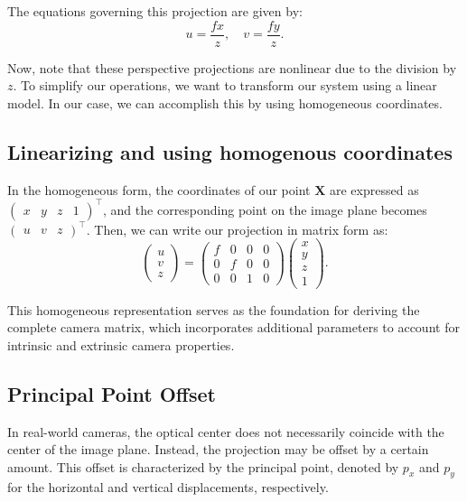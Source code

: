\documentclass[12pt]{article}
\begin{document}
The equations governing this projection are given by:
$$
u = \frac{f x}{z}, \quad v = \frac{f y}{z}.
$$

Now, note that these perspective projections are nonlinear due to the division by $z$. To simplify our operations, we want to transform our system using a linear model. In our case, we can accomplish this by using homogeneous coordinates.

\subsection{Linearizing and using homogenous coordinates}

In the homogeneous form, the coordinates of our point $\mathbf{X}$ are expressed as $\begin{pmatrix} x & y & z & 1 \end{pmatrix}^\top$, and the corresponding point on the image plane becomes $\begin{pmatrix} u & v & z \end{pmatrix}^\top$. Then, we can write our projection in matrix form as:
$$
\begin{pmatrix} u \\ v \\ z \end{pmatrix} = 
\begin{pmatrix}
f & 0 & 0 & 0 \\
0 & f & 0 & 0 \\
0 & 0 & 1 & 0
\end{pmatrix}
\begin{pmatrix} x \\ y \\ z \\ 1 \end{pmatrix}.
$$

This homogeneous representation serves as the foundation for deriving the complete camera matrix, which incorporates additional parameters to account for intrinsic and extrinsic camera properties.

\subsection{Principal Point Offset}

In real-world cameras, the optical center does not necessarily coincide with the center of the image plane. Instead, the projection may be offset by a certain amount. This offset is characterized by the principal point, denoted by $p_x$ and $p_y$ for the horizontal and vertical displacements, respectively.
\end{document}
